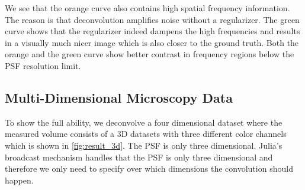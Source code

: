 \documentclass{juliacon}
\begin{document}
        We see that the orange curve also contains high spatial frequency information. The reason is that deconvolution amplifies noise
        without a regularizer. The green curve shows that the regularizer indeed dampens the high frequencies and results in a visually much
        nicer image which is also closer to the ground truth.
        Both the orange and the green curve show better contrast in frequency regions below the PSF resolution limit.

    \subsection{Multi-Dimensional Microscopy Data}
        To show the full ability, we deconvolve a four dimensional dataset where the measured volume consists of a 3D datasets
        with three different color channels which is shown in \autoref{fig:result_3d}.
        The PSF is only three dimensional.
        Julia's broadcast mechanism handles that the PSF is only three dimensional and therefore
        we only need to specify over which dimensions the convolution should happen.
\end{document}
